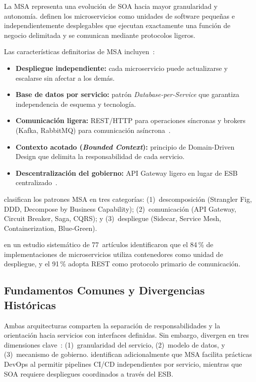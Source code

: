 \documentclass[conference,a4paper]{IEEEtran}
\begin{document}
La MSA representa una evoluci\'on de SOA hacia mayor granularidad
y autonom\'ia. \textcite{velepucha2023} definen los microservicios
como unidades de software peque\~nas e independientemente desplegables
que ejecutan exactamente una funci\'on de negocio delimitada y se
comunican mediante protocolos ligeros.

Las caracter\'isticas definitorias de MSA incluyen~\cite{aksakalli2021,waseem2021}:

\begin{itemize}[leftmargin=*]
  \item \textbf{Despliegue independiente:} cada microservicio puede
    actualizarse y escalarse sin afectar a los dem\'as.
  \item \textbf{Base de datos por servicio:} patr\'on
    \textit{Database-per-Service} que garantiza independencia de
    esquema y tecnolog\'ia.
  \item \textbf{Comunicaci\'on ligera:} REST/HTTP para operaciones
    s\'incronas y brokers (Kafka, RabbitMQ) para comunicaci\'on
    as\'incrona~\cite{blinowski2022}.
  \item \textbf{Contexto acotado (\textit{Bounded Context}):}
    principio de Domain-Driven Design que delimita la responsabilidad
    de cada servicio.
  \item \textbf{Descentralizaci\'on del gobierno:} API Gateway
    ligero en lugar de ESB centralizado~\cite{newman2021}.
\end{itemize}

\textcite{velepucha2023} clasifican los patrones MSA en tres
categor\'ias: (1)~descomposici\'on (Strangler Fig, DDD, Decompose
by Business Capability); (2)~comunicaci\'on (API Gateway, Circuit
Breaker, Saga, CQRS); y (3)~despliegue (Sidecar, Service Mesh,
Containerization, Blue-Green).

\textcite{alshuqayran2016} en un estudio sistem\'atico de 77~art\'iculos
identificaron que el 84\,\% de implementaciones de microservicios
utiliza contenedores como unidad de despliegue, y el 91\,\%
adopta REST como protocolo primario de comunicaci\'on.

\subsection{Fundamentos Comunes y Divergencias Hist\'oricas}

Ambas arquitecturas comparten la separaci\'on de responsabilidades
y la orientaci\'on hacia servicios con interfaces definidas. Sin
embargo, divergen en tres dimensiones clave~\cite{blinowski2022}:
(1)~granularidad del servicio, (2)~modelo de datos, y
(3)~mecanismo de gobierno. \textcite{waseem2021} identifican
adicionalmente que MSA facilita pr\'acticas DevOps al permitir
pipelines CI/CD independientes por servicio, mientras que SOA
requiere despliegues coordinados a trav\'es del ESB.
\end{document}
